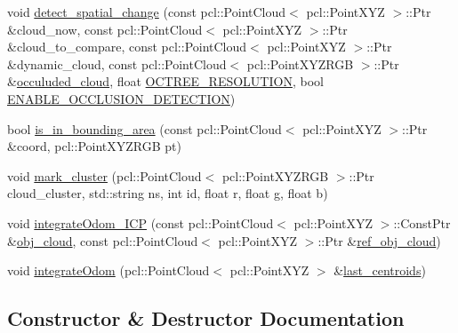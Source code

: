 \begin{DoxyCompactItemize}
\item 
void \hyperlink{classdatmo_1_1cloud__segmentation_a6dcd90f46e590756a42aafd290443fcf}{detect\+\_\+spatial\+\_\+change} (const pcl\+::\+Point\+Cloud$<$ pcl\+::\+Point\+X\+YZ $>$\+::Ptr \&cloud\+\_\+now, const pcl\+::\+Point\+Cloud$<$ pcl\+::\+Point\+X\+YZ $>$\+::Ptr \&cloud\+\_\+to\+\_\+compare, const pcl\+::\+Point\+Cloud$<$ pcl\+::\+Point\+X\+YZ $>$\+::Ptr \&dynamic\+\_\+cloud, const pcl\+::\+Point\+Cloud$<$ pcl\+::\+Point\+X\+Y\+Z\+R\+GB $>$\+::Ptr \&\hyperlink{classdatmo_1_1cloud__segmentation_a2f85f1a51b2e90dbce996d90cb3e0155}{occuluded\+\_\+cloud}, float \hyperlink{classdatmo_1_1cloud__segmentation_aba086f9f8e05f18c02c042c057854a06}{O\+C\+T\+R\+E\+E\+\_\+\+R\+E\+S\+O\+L\+U\+T\+I\+ON}, bool \hyperlink{classdatmo_1_1cloud__segmentation_a5f7ffa75c60af605cc914de7296cddb1}{E\+N\+A\+B\+L\+E\+\_\+\+O\+C\+C\+L\+U\+S\+I\+O\+N\+\_\+\+D\+E\+T\+E\+C\+T\+I\+ON})
\item 
bool \hyperlink{classdatmo_1_1cloud__segmentation_a5bcf85ac924671c64840ac2087877a5f}{is\+\_\+in\+\_\+bounding\+\_\+area} (const pcl\+::\+Point\+Cloud$<$ pcl\+::\+Point\+X\+YZ $>$\+::Ptr \&coord, pcl\+::\+Point\+X\+Y\+Z\+R\+GB pt)
\item 
void \hyperlink{classdatmo_1_1cloud__segmentation_a77ecff192bbc43fd3182acb675d43350}{mark\+\_\+cluster} (pcl\+::\+Point\+Cloud$<$ pcl\+::\+Point\+X\+Y\+Z\+R\+GB $>$\+::Ptr cloud\+\_\+cluster, std\+::string ns, int id, float r, float g, float b)
\item 
void \hyperlink{classdatmo_1_1cloud__segmentation_ab2a36cd996f3d1eb002a357008836ef6}{integrate\+Odom\+\_\+\+I\+CP} (const pcl\+::\+Point\+Cloud$<$ pcl\+::\+Point\+X\+YZ $>$\+::Const\+Ptr \&\hyperlink{classdatmo_1_1cloud__segmentation_ad946a48ab59bf9f48338f9ef0702181c}{obj\+\_\+cloud}, const pcl\+::\+Point\+Cloud$<$ pcl\+::\+Point\+X\+YZ $>$\+::Ptr \&\hyperlink{classdatmo_1_1cloud__segmentation_a4f4926a401828fc5226665963a2212cf}{ref\+\_\+obj\+\_\+cloud})
\item 
void \hyperlink{classdatmo_1_1cloud__segmentation_a40bcbb38bad5059c86e845e84ac113d0}{integrate\+Odom} (pcl\+::\+Point\+Cloud$<$ pcl\+::\+Point\+X\+YZ $>$ \&\hyperlink{classdatmo_1_1cloud__segmentation_a576b87bb01fef0d14ba862f08ca8e2ba}{last\+\_\+centroids})
\end{DoxyCompactItemize}


\subsection{Constructor \& Destructor Documentation}
\mbox{\label{classdatmo_1_1cloud__segmentation_a7624176c1ff33d2fa3930bf9eef89c19}} 
